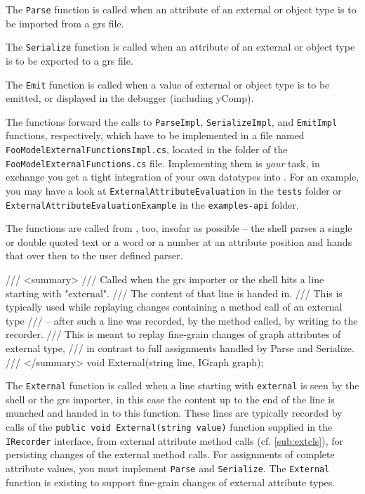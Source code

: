 
The \texttt{Parse} function is called when an attribute of an external or object type is to be imported from a grs file.

The \texttt{Serialize} function is called when an attribute of an external or object type is to be exported to a grs file.

The \texttt{Emit} function is called when a value of external or object type is to be emitted, or displayed in the debugger (including yComp).

The functions forward the calls to \texttt{ParseImpl}, \texttt{SerializeImpl}, and \texttt{EmitImpl} functions, respectively, which have to be implemented in a file named \texttt{Foo\-Model\-External\-Functions\-Impl.cs}, located in the folder of the \texttt{Foo\-Model\-External\-Functions.cs} file.
Implementing them is \emph{your} task, in exchange you get a tight integration of your own datatypes into \GrG.
For an example, you may have a look at \texttt{External\-Attribute\-Evaluation} in the \texttt{tests} folder or \texttt{External\-Attribute\-Evaluation\-Example} in the \texttt{examples-api} folder.

The functions are called from \GrShell, too, insofar as possible -- the shell parses a single or double quoted text or a word or a number at an attribute position and hands that over then to the user defined parser.

\begin{csharplet}
/// <summary>
/// Called when the grs importer or the shell hits a line starting with "external".
/// The content of that line is handed in.
/// This is typically used while replaying changes containing a method call of an external type
/// -- after such a line was recorded, by the method called, by writing to the recorder.
/// This is meant to replay fine-grain changes of graph attributes of external type,
/// in contrast to full assignments handled by Parse and Serialize.
/// </summary>
void External(string line, IGraph graph);
\end{csharplet}

The \texttt{External} function is called when a line starting with \texttt{external} is seen by the shell or the grs importer, in this case the content up to the end of the line is munched and handed in to this function.
These lines are typically recorded by calls of the \texttt{public void External(string value)} function supplied in the \texttt{IRecorder} interface, from external attribute method calls (cf. \ref{sub:extcls}), for persisting changes of the external method calls.
For assignments of complete attribute values, you must implement \texttt{Parse} and \texttt{Serialize}.
The \texttt{External} function is existing to support fine-grain changes of external attribute types.

